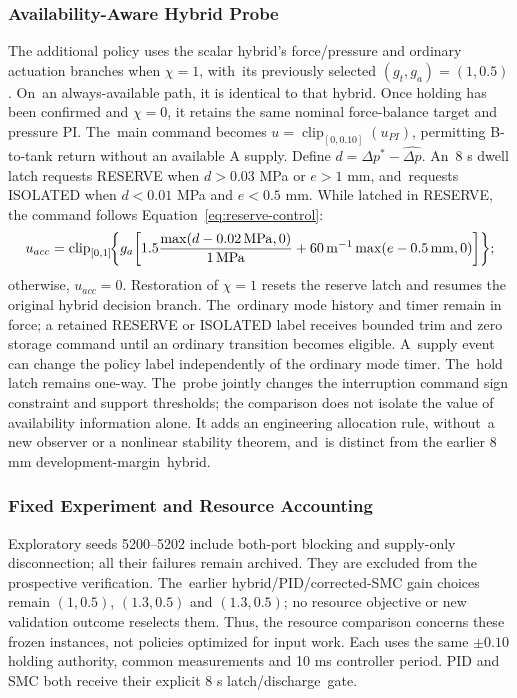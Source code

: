 \documentclass[machines,article,submit,pdftex,moreauthors]{Definitions/mdpi}
\begin{document}
\subsubsection{Availability-Aware Hybrid Probe}
The additional policy uses the scalar hybrid's force/pressure and ordinary actuation branches when $\chi=1$, with~its previously selected $(g_t,g_a)=(1,0.5)$. On~an always-available path, it is identical to that hybrid. Once holding has been confirmed and $\chi=0$, it retains the same nominal force-balance target and pressure PI. The~main command becomes $u=\operatorname{clip}_{[0,0.10]}(u_{PI})$, permitting B-to-tank return without an available A supply. Define $d=\Delta p^*-\widehat{\Delta p}$. An~8 s dwell latch requests RESERVE when $d>0.03$ MPa or $e>1$ mm, and~requests ISOLATED when $d<0.01$ MPa and $e<0.5$ mm. While latched in RESERVE, the command follows Equation~\eqref{eq:reserve-control}:
\begin{equation}
 u_{acc}=\operatorname{clip}_{[0,1]}\!\left\{
 g_a\left[1.5\frac{\max(d-0.02\,{\rm MPa},0)}{1\,{\rm MPa}}
       +60\,{\rm m}^{-1}\max(e-0.5\,{\rm mm},0)\right]\right\};\label{eq:reserve-control}
\end{equation}
otherwise, $u_{acc}=0$. Restoration of $\chi=1$ resets the reserve latch and resumes the original hybrid decision branch. The~ordinary mode history and timer remain in force; a retained RESERVE or ISOLATED label receives bounded trim and zero storage command until an ordinary transition becomes eligible. A~supply event can change the policy label independently of the ordinary mode timer. The~hold latch remains one-way. The~probe jointly changes the interruption command sign constraint and support thresholds; the comparison does not isolate the value of availability information alone. It adds an engineering allocation rule, without~a new observer or a nonlinear stability theorem, and~is distinct from the earlier 8 mm development-margin~hybrid.

\subsubsection{Fixed Experiment and Resource Accounting}
Exploratory seeds 5200--5202 include both-port blocking and supply-only disconnection; all their failures remain archived. They are excluded from the prospective verification. The~earlier hybrid/PID/corrected-SMC gain choices remain $(1,0.5)$, $(1.3,0.5)$ and $(1.3,0.5)$; no resource objective or new validation outcome reselects them. Thus, the resource comparison concerns these frozen instances, not policies optimized for input work. Each uses the same $\pm0.10$ holding authority, common measurements and 10 ms controller period. PID and SMC both receive their explicit 8 s latch/discharge~gate.
\end{document}
